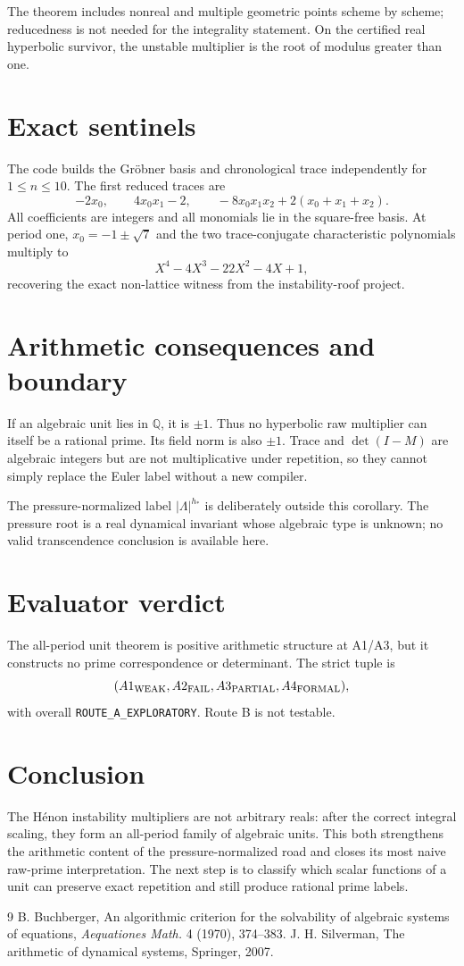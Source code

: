 \documentclass[11pt]{article}
\theoremstyle{remark}\newtheorem{remark}[theorem]{Remark}
\begin{document}
The theorem includes nonreal and multiple geometric points scheme by scheme;
reducedness is not needed for the integrality statement.  On the certified
real hyperbolic survivor, the unstable multiplier is the root of modulus
greater than one.

\section{Exact sentinels}
The code builds the Gr\"obner basis and chronological trace independently for
$1\le n\le10$.  The first reduced traces are
\[
-2x_0,
\qquad
4x_0x_1-2,
\qquad
-8x_0x_1x_2+2(x_0+x_1+x_2).
\]
All coefficients are integers and all monomials lie in the square-free
basis.  At period one, $x_0=-1\pm\sqrt7$ and the two trace-conjugate
characteristic polynomials multiply to
\[
X^4-4X^3-22X^2-4X+1,
\]
recovering the exact non-lattice witness from the instability-roof project.

\section{Arithmetic consequences and boundary}
If an algebraic unit lies in $\mathbb Q$, it is $\pm1$.  Thus no hyperbolic
raw multiplier can itself be a rational prime.  Its field norm is also
$\pm1$.  Trace and $\det(I-M)$ are algebraic integers but are not
multiplicative under repetition, so they cannot simply replace the Euler
label without a new compiler.

The pressure-normalized label $|\Lambda|^{h_*}$ is deliberately outside this
corollary.  The pressure root is a real dynamical invariant whose algebraic
type is unknown; no valid transcendence conclusion is available here.

\section{Evaluator verdict}
The all-period unit theorem is positive arithmetic structure at A1/A3, but
it constructs no prime correspondence or determinant.  The strict tuple is
\[
(A1_{\rm WEAK},A2_{\rm FAIL},A3_{\rm PARTIAL},A4_{\rm FORMAL}),
\]
with overall \texttt{ROUTE\_A\_EXPLORATORY}.  Route B is not testable.

\section{Conclusion}
The H\'enon instability multipliers are not arbitrary reals: after the
correct integral scaling, they form an all-period family of algebraic units.
This both strengthens the arithmetic content of the pressure-normalized road
and closes its most naive raw-prime interpretation.  The next step is to
classify which scalar functions of a unit can preserve exact repetition and
still produce rational prime labels.

\begin{thebibliography}{9}
B. Buchberger, An algorithmic criterion for the solvability of algebraic
systems of equations, \emph{Aequationes Math.} 4 (1970), 374--383.
J. H. Silverman, The arithmetic of dynamical systems, Springer, 2007.
\end{thebibliography}
\end{document}
